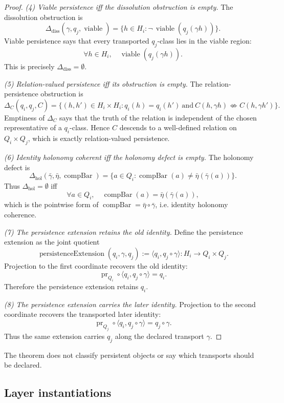 \documentclass[11pt]{article}
\theoremstyle{definition}
\begin{document}
\begin{proof}
\emph{(4) Viable persistence iff the dissolution obstruction is
empty.}
The dissolution obstruction is
\[
  \Delta_{\mathrm{diss}}(\gamma,q_j,\operatorname{viable})
  =
  \{h\in H_i:
      \neg\,\operatorname{viable}(q_j(\gamma h))\}.
\]
Viable persistence says that every transported \(q_j\)-class lies in
the viable region:
\[
  \forall h\in H_i,\quad
  \operatorname{viable}(q_j(\gamma h)).
\]
This is precisely \(\Delta_{\mathrm{diss}}=\emptyset\).

\emph{(5) Relation-valued persistence iff its obstruction is empty.}
The relation-persistence obstruction is
\[
  \Delta_C(q_i,q_j,C)
  =
  \{(h,h')\in H_i\times H_i:
    q_i(h)=q_i(h')\ \text{and}\
    C(h,\gamma h)\not\iff C(h,\gamma h')\}.
\]
Emptiness of \(\Delta_C\) says that the truth of the relation is
independent of the chosen representative of a \(q_i\)-class.  Hence
\(C\) descends to a well-defined relation on
\(Q_i\times Q_j\), which is exactly relation-valued persistence.

\emph{(6) Identity holonomy coherent iff the holonomy defect is
empty.}
The holonomy defect is
\[
  \Delta_{\mathrm{hol}}(\bar\gamma,\bar\eta,\operatorname{compBar})
  =
  \{a\in Q_i:
      \operatorname{compBar}(a)\ne\bar\eta(\bar\gamma(a))\}.
\]
Thus \(\Delta_{\mathrm{hol}}=\emptyset\) iff
\[
  \forall a\in Q_i,\quad
  \operatorname{compBar}(a)=\bar\eta(\bar\gamma(a)),
\]
which is the pointwise form of
\(\operatorname{compBar}=\bar\eta\circ\bar\gamma\), i.e. identity
holonomy coherence.

\emph{(7) The persistence extension retains the old identity.}
Define the persistence extension as the joint quotient
\[
  \operatorname{persistenceExtension}(q_i,\gamma,q_j)
  :=
  \langle q_i,q_j\circ\gamma\rangle:H_i\to Q_i\times Q_j.
\]
Projection to the first coordinate recovers the old identity:
\[
  \operatorname{pr}_{Q_i}\circ
  \langle q_i,q_j\circ\gamma\rangle=q_i.
\]
Therefore the persistence extension retains \(q_i\).

\emph{(8) The persistence extension carries the later identity.}
Projection to the second coordinate recovers the transported later
identity:
\[
  \operatorname{pr}_{Q_j}\circ
  \langle q_i,q_j\circ\gamma\rangle=q_j\circ\gamma.
\]
Thus the same extension carries \(q_j\) along the declared transport
\(\gamma\).
\end{proof}

The theorem does not classify persistent objects or say which
transports should be declared.

\subsection*{Layer instantiations}\label{layer-inst:F19}
\end{document}
